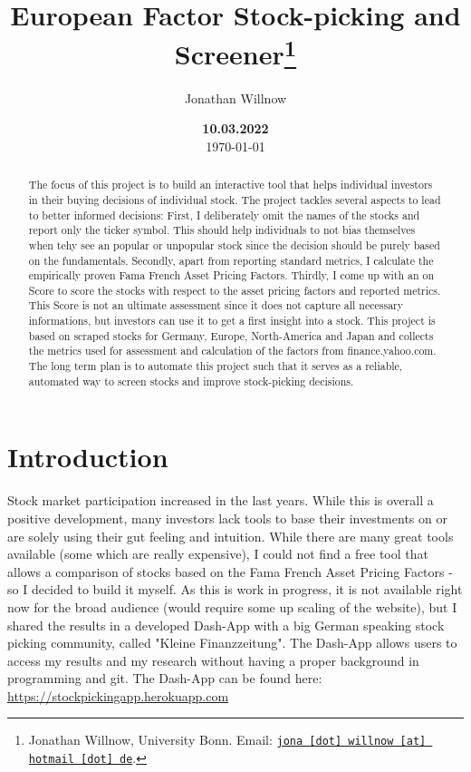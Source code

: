 \documentclass[11pt, a4paper, leqno]{article}
\begin{document}
\title{European Factor Stock-picking and Screener\thanks{Jonathan Willnow, University Bonn. Email: \href{mailto:jona.willnow@hotmail.de}{\nolinkurl{jona [dot] willnow [at] hotmail [dot] de}}.}}

\author{Jonathan Willnow}

\date{
    {\bf 10.03.2022}
    \\[1ex]
    \today
}

\maketitle


\begin{abstract}
    The focus of this project is to build an interactive tool that helps individual investors in their buying decisions of individual stock. 
    The project tackles several aspects to lead to better informed decisions: First, I deliberately omit the names of the stocks and report only the ticker symbol.
    This should help individuals to not bias themselves when tehy see an popular or unpopular stock since the decision should be purely based on the fundamentals.
    Secondly, apart from reporting standard metrics, I calculate the empirically proven Fama French Asset Pricing Factors. Thirdly, I come up with an on Score to score the stocks
    with respect to the asset pricing factors and reported metrics. This Score is not an ultimate assessment since it does not capture all necessary informations, 
    but investors can use it to get a first insight into a stock.
    This project is based on scraped stocks for Germany, Europe, North-America and Japan and collects the metrics used for assessment and calculation of the factors
    from finance.yahoo.com. The long term plan is to automate this project such that it serves as a reliable, automated way to screen stocks and improve stock-picking decisions.
\end{abstract}
\clearpage

\section{Introduction} %
\label{sec:introduction}
Stock market participation increased in the last years. While this is overall a positive development, many investors lack tools to base their investments on or are solely using their
gut feeling and intuition. While there are many great tools available (some which are really expensive), I could not find a free tool that allows a comparison of stocks based on the Fama French Asset Pricing Factors - so I 
decided to build it myself. As this is work in progress, it is not available right now for the broad audience (would require some up scaling of the website), but I shared the results in a developed Dash-App with a big German speaking 
stock picking community, called "Kleine Finanzzeitung". The Dash-App allows users to access my results and my research without having a proper background in programming and git.
The Dash-App can be found here: \url{https://stockpickingapp.herokuapp.com}
\end{document}
